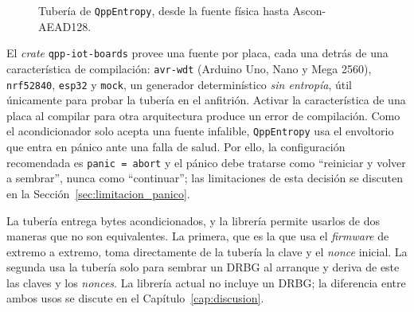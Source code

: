 \begin{figure}[H]
\centering
{}
\caption{Tubería de \texttt{QppEntropy}, desde la fuente física hasta Ascon-AEAD128.}
\label{fig:tuberia}
\end{figure}

El \textit{crate} \texttt{qpp-iot-boards} provee una fuente por placa, cada una detrás de una característica de compilación: \texttt{avr-wdt} (Arduino Uno, Nano y Mega 2560), \texttt{nrf52840}, \texttt{esp32} y \texttt{mock}, un generador determinístico \emph{sin entropía}, útil únicamente para probar la tubería en el anfitrión. Activar la característica de una placa al compilar para otra arquitectura produce un error de compilación. Como el acondicionador solo acepta una fuente infalible, \texttt{QppEntropy} usa el envoltorio que entra en pánico ante una falla de salud. Por ello, la configuración recomendada es \texttt{panic = \textquotedbl{}abort\textquotedbl{}} y el pánico debe tratarse como ``reiniciar y volver a sembrar'', nunca como ``continuar''; las limitaciones de esta decisión se discuten en la Sección~\ref{sec:limitacion_panico}.

La tubería entrega bytes acondicionados, y la librería permite usarlos de dos maneras que no son equivalentes. La primera, que es la que usa el \textit{firmware} de extremo a extremo, toma directamente de la tubería la clave y el \textit{nonce} inicial. La segunda usa la tubería solo para sembrar un DRBG al arranque y deriva de este las claves y los \textit{nonces}. La librería actual no incluye un DRBG; la diferencia entre ambos usos se discute en el Capítulo~\ref{cap:discusion}.


